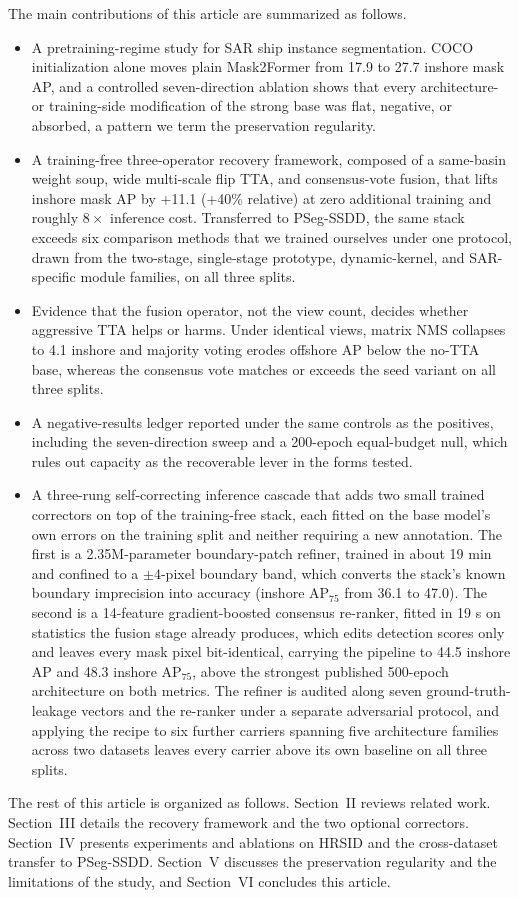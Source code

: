 The main contributions of this article are summarized as follows.
\begin{itemize}
\item A pretraining-regime study for SAR ship instance segmentation. COCO initialization alone moves plain Mask2Former from 17.9 to 27.7 inshore mask AP, and a controlled seven-direction ablation shows that every architecture- or training-side modification of the strong base was flat, negative, or absorbed, a pattern we term the preservation regularity.
\item A training-free three-operator recovery framework, composed of a same-basin weight soup, wide multi-scale flip TTA, and consensus-vote fusion, that lifts inshore mask AP by +11.1 (+40\% relative) at zero additional training and roughly $8\times$ inference cost. Transferred to PSeg-SSDD, the same stack exceeds six comparison methods that we trained ourselves under one protocol, drawn from the two-stage, single-stage prototype, dynamic-kernel, and SAR-specific module families, on all three splits.
\item Evidence that the fusion operator, not the view count, decides whether aggressive TTA helps or harms. Under identical views, matrix NMS collapses to 4.1 inshore and majority voting erodes offshore AP below the no-TTA base, whereas the consensus vote matches or exceeds the seed variant on all three splits.
\item A negative-results ledger reported under the same controls as the positives, including the seven-direction sweep and a 200-epoch equal-budget null, which rules out capacity as the recoverable lever in the forms tested.
\item A three-rung self-correcting inference cascade that adds two small trained correctors on top of the training-free stack, each fitted on the base model's own errors on the training split and neither requiring a new annotation. The first is a 2.35M-parameter boundary-patch refiner, trained in about 19 min and confined to a $\pm 4$-pixel boundary band, which converts the stack's known boundary imprecision into accuracy (inshore AP$_{75}$ from 36.1 to 47.0). The second is a 14-feature gradient-boosted consensus re-ranker, fitted in 19 s on statistics the fusion stage already produces, which edits detection scores only and leaves every mask pixel bit-identical, carrying the pipeline to 44.5 inshore AP and 48.3 inshore AP$_{75}$, above the strongest published 500-epoch architecture on both metrics. The refiner is audited along seven ground-truth-leakage vectors and the re-ranker under a separate adversarial protocol, and applying the recipe to six further carriers spanning five architecture families across two datasets leaves every carrier above its own baseline on all three splits.
\end{itemize}

The rest of this article is organized as follows. Section~II reviews related work. Section~III details the recovery framework and the two optional correctors. Section~IV presents experiments and ablations on HRSID and the cross-dataset transfer to PSeg-SSDD. Section~V discusses the preservation regularity and the limitations of the study, and Section~VI concludes this article.
